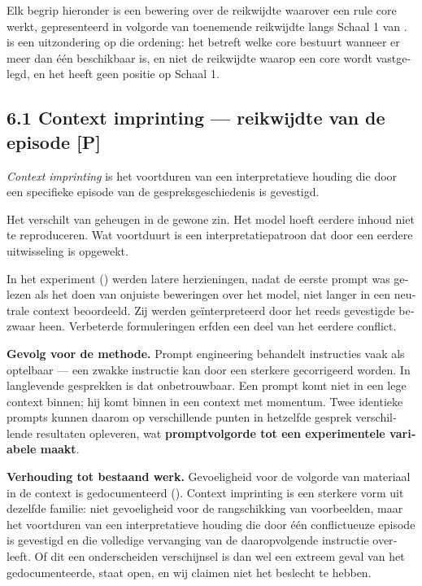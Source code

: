 \begin{dutch}
Elk begrip hieronder is een bewering over de reikwijdte waarover een rule core werkt, gepresenteerd in volgorde van toenemende reikwijdte langs Schaal 1 van .  is een uitzondering op die ordening: het betreft welke core bestuurt wanneer er meer dan één beschikbaar is, en niet de reikwijdte waarop een core wordt vastgelegd, en het heeft geen positie op Schaal 1.


\subsection*{6.1 Context imprinting — reikwijdte van de episode \textbf{[P]}}
\label{sec:nl:6.1}

\emph{Context imprinting} is het voortduren van een interpretatieve houding die door een specifieke episode van de gespreksgeschiedenis is gevestigd.

Het verschilt van geheugen in de gewone zin. Het model hoeft eerdere inhoud niet te reproduceren. Wat voortduurt is een interpretatiepatroon dat door een eerdere uitwisseling is opgewekt.

In het experiment () werden latere herzieningen, nadat de eerste prompt was gelezen als het doen van onjuiste beweringen over het model, niet langer in een neutrale context beoordeeld. Zij werden geïnterpreteerd door het reeds gevestigde bezwaar heen. Verbeterde formuleringen erfden een deel van het eerdere conflict.

\textbf{Gevolg voor de methode.} Prompt engineering behandelt instructies vaak als optelbaar — een zwakke instructie kan door een sterkere gecorrigeerd worden. In langlevende gesprekken is dat onbetrouwbaar. Een prompt komt niet in een lege context binnen; hij komt binnen in een context met momentum. Twee identieke prompts kunnen daarom op verschillende punten in hetzelfde gesprek verschillende resultaten opleveren, wat \textbf{promptvolgorde tot een experimentele variabele maakt}.

\textbf{Verhouding tot bestaand werk.} Gevoeligheid voor de volgorde van materiaal in de context is gedocumenteerd (). Context imprinting is een sterkere vorm uit dezelfde familie: niet gevoeligheid voor de rangschikking van voorbeelden, maar het voortduren van een interpretatieve houding die door één conflictueuze episode is gevestigd en die volledige vervanging van de daaropvolgende instructie overleeft. Of dit een onderscheiden verschijnsel is dan wel een extreem geval van het gedocumenteerde, staat open, en wij claimen niet het beslecht te hebben.


\end{dutch}
